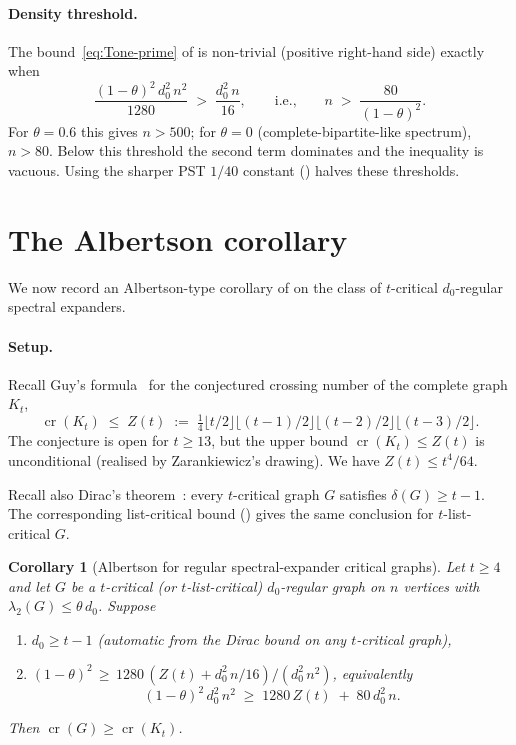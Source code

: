 \documentclass[11pt,a4paper]{article}
\newtheorem{corollary}[theorem]{Corollary}
\theoremstyle{definition}
\DeclareMathOperator{\crN}{cr}
\begin{document}
\paragraph{Density threshold.}
The bound~\eqref{eq:Tone-prime} of  is non-trivial
(positive right-hand side) exactly when
\[
   \frac{(1 - \theta)^{2}\,d_0^{2}\,n^{2}}{1280} \;>\; \frac{d_0^{2}\,n}{16},
   \qquad \text{i.e.,} \qquad n \;>\; \frac{80}{(1 - \theta)^{2}}.
\]
For $\theta = 0.6$ this gives $n > 500$; for $\theta = 0$
(complete-bipartite-like spectrum), $n > 80$. Below this
threshold the second term dominates and the inequality is
vacuous. Using the sharper PST $1/40$ constant
() halves these thresholds.

\section{The Albertson corollary}\label{sec:albertson}

We now record an Albertson-type corollary of  on
the class of $t$-critical $d_0$-regular spectral expanders.

\paragraph{Setup.}
Recall Guy's formula~\cite{Guy} for the conjectured crossing number
of the complete graph $K_t$,
\[
   \crN(K_t) \;\le\; Z(t) \;:=\; \tfrac{1}{4} \lfloor t/2 \rfloor \lfloor (t-1)/2 \rfloor
                 \lfloor (t-2)/2 \rfloor \lfloor (t-3)/2 \rfloor.
\]
The conjecture is open for $t \ge 13$, but the upper bound
$\crN(K_t) \le Z(t)$ is unconditional (realised by Zarankiewicz's
drawing). We have $Z(t) \le t^{4}/64$.

Recall also Dirac's theorem~\cite{Dirac1952}: every $t$-critical
graph $G$ satisfies $\delta(G) \ge t - 1$. The corresponding
list-critical bound (\cite[Lemma 2.1 of our companion list paper]{D15})
gives the same conclusion for $t$-list-critical $G$.

\begin{corollary}[Albertson for regular spectral-expander critical graphs]\label{cor:albertson}
Let $t \ge 4$ and let $G$ be a $t$-critical (or $t$-list-critical)
$d_0$-regular graph on $n$ vertices with
$\lambda_2(G) \le \theta\,d_0$. Suppose
\begin{enumerate}
\item[(a)] $d_0 \ge t - 1$ (automatic from the Dirac bound on
  any $t$-critical graph),
\item[(b)] $(1 - \theta)^{2} \,\ge\, 1280\,(Z(t) + d_0^{2}\,n/16) / (d_0^{2}\,n^{2})$,
  equivalently
  \begin{equation}\label{eq:cor-cond}
     (1 - \theta)^{2}\,d_0^{2}\,n^{2} \;\ge\; 1280\,Z(t) \;+\; 80\,d_0^{2}\,n.
  \end{equation}
\end{enumerate}
Then $\crN(G) \ge \crN(K_t)$.
\end{corollary}
\end{document}
